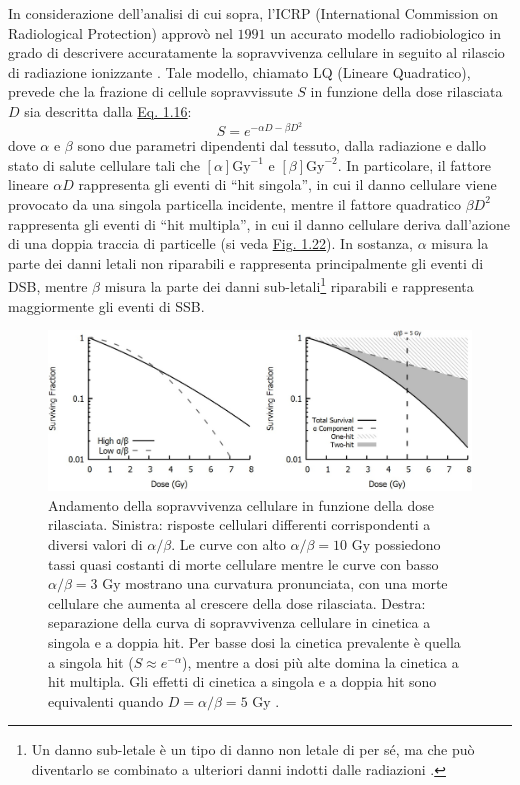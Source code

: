 \documentclass[12pt,a4paper,twoside]{report}
\begin{document}
	In considerazione dell'analisi di cui sopra, l'ICRP (International Commission on Radiological Protection) approvò nel $1991$ un accurato modello radiobiologico in grado di descrivere accuratamente la sopravvivenza cellulare in seguito al rilascio di radiazione ionizzante \cite{icrpAnn}. Tale modello, chiamato LQ (Lineare Quadratico), prevede che la frazione di cellule sopravvissute $S$ in funzione della dose rilasciata $D$ sia descritta dalla \hyperref[eq:survival2]{Eq. 1.16}:
	\begin{equation}
		S=e^{-\alpha D-\beta D^2}
		\label{eq:survival2}
	\end{equation}
	dove $\alpha$ e $\beta$ sono due parametri dipendenti dal tessuto, dalla radiazione e dallo stato di salute cellulare tali che $\left[\alpha\right]\mbox{Gy}^{-1}$ e $\left[\beta\right]\mbox{Gy}^{-2}$. In particolare, il fattore lineare $\alpha D$ rappresenta gli eventi di ``hit singola'', in cui il danno cellulare viene provocato da una singola particella incidente, mentre il fattore quadratico $\beta D^2$ rappresenta gli eventi di ``hit multipla'', in cui il danno cellulare deriva dall'azione di una doppia traccia di particelle (si veda \hyperref[fig:survival_cell]{Fig. 1.22}). In sostanza, $\alpha$ misura la parte dei danni letali non riparabili e rappresenta principalmente gli eventi di DSB, mentre $\beta$ misura la parte dei danni sub-letali\footnote{Un danno sub-letale è un tipo di danno non letale di per sé, ma che può diventarlo se combinato a ulteriori danni indotti dalle radiazioni \cite{McMahon_2019}.} riparabili e rappresenta maggiormente gli eventi di SSB.
	\begin{figure}[H]
		\centering
		\includegraphics[width=0.9\linewidth]{survival_cell.jpg}
		\caption{Andamento della sopravvivenza cellulare in funzione della dose rilasciata. Sinistra: risposte cellulari differenti corrispondenti a diversi valori di $\alpha/\beta$. Le curve con alto $\alpha/\beta=10\mbox{ Gy}$ possiedono tassi quasi costanti di morte cellulare mentre le curve con basso $\alpha/\beta=3\mbox{ Gy}$ mostrano una curvatura pronunciata, con una morte cellulare che aumenta al crescere della dose rilasciata. Destra: separazione della curva di sopravvivenza cellulare in cinetica a singola e a doppia hit. Per basse dosi la cinetica prevalente è quella a singola hit ($S\approx e^{-\alpha}$), mentre a dosi più alte domina la cinetica a hit multipla. Gli effetti di cinetica a singola e a doppia hit sono equivalenti quando $D=\alpha/\beta=5\mbox{ Gy}$ \cite{McMahon_2019}.}
		\label{fig:survival_cell}
	\end{figure}
\end{document}
